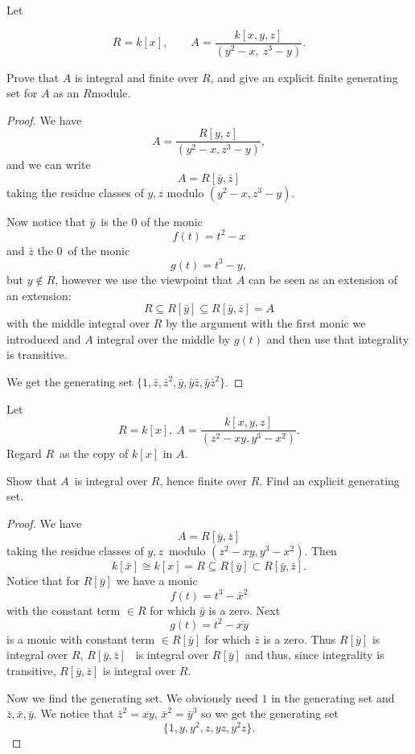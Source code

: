 \documentclass[11pt]{article}
\begin{document}
\begin{prob}
    Let

    $$R=k[x],\qquad A=\frac{k[x,y,z]}{(y^2-x,\ z^3-y)}.$$

    Prove that $A$ is integral and finite over $R$, and give an explicit finite generating set for $A$ as an $R$\-module.
\end{prob}
\begin{proof}
    We have 
    \[
        A = \frac{R[y,z]}{(y^2-x, z^3-y)}, 
    \]
    and we can write 
    \[
        A = R[\bar y, \bar z]
    \]
    taking the residue classes of $y,z$ modulo 
    $(y^2 - x, z^3 -y)$. 

    Now notice that $\bar y$ is the $0$ of the monic 
    \[
        f(t) = t^2 - x 
    \]
    and $\bar z$ the $0$ of the monic 
    \[
        g(t) = t^3 - y, 
    \]
    but $y\not \in R$, however we use the viewpoint that 
    $A$ can be seen as an extension of an extension: 
    \[
        R \subseteq R[\bar y] \subseteq R[\bar y,\bar z] = A 
    \]
    with the middle integral over $R$ by the 
    argument with the first monic we introduced and 
    $A$ integral over the middle by 
    $g(t)$ and then use that integrality is transitive. 

    We get the generating set 
    $\{1,\bar z,\bar z^2,\bar y,\bar y\bar z,\bar y\bar z^2\}$.
\end{proof}

\begin{prob}
    Let 
    \[
        R = k[x], \ A = \frac{k[x,y,z]}{(z^2-xy, y^3-x^2)}.
    \]
    Regard $R$ as the copy of $k[x]$ in $A$. 

    Show that $A$ is integral over $R$, hence finite over 
    $R$. Find an explicit generating set. 
\end{prob}
\begin{proof}
    We have 
    \[
        A = R[\bar y, \bar z]
    \]
    taking the residue classes of $y,z$ modulo 
    $(z^2-xy, y^3 - x^2)$. 
    Then 
    \[
        k[\bar x] \cong k[x] = R 
        \subseteq R[\bar y] \subset R[\bar y, \bar z].   
    \]
    Notice that for $R[\bar y]$ we have a monic 
    \[
        f(t) = t^3 - \bar x^2 
    \]
    with the constant term $\in R$ for which $\bar y$ is 
    a zero. 
    Next 
    \[
        g(t) = t^2 - \overline{xy} 
    \]
    is a monic with constant term $\in R[\bar y]$ for 
    which $\bar z$ is a zero. Thus 
    $R[\bar y]$ is integral over $R$, $R[\bar y, \bar z]$ 
    is integral over $R[\bar y]$ and thus, since 
    integrality is transitive, $R[\bar y, \bar z]$ is integral over 
    $R$. 

    Now we find the generating set. 
    We obviously need $1$ in the generating set 
    and $\bar z, \bar x, \bar y$. 
    We notice that $\bar z^2 = \overline{xy}$, 
    $\bar x^2 = \bar y^3$ so we get the generating set 
    \[
        \{1,y,y^2,z,yz,y^2z\}. 
    \]
    
\end{proof}
\end{document}
